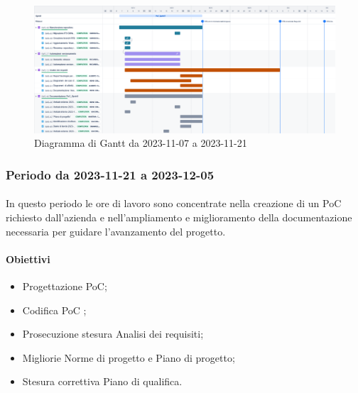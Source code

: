 \documentclass[10pt, a4paper]{article}
\begin{document}
{{{{{{{ \begin{figure}[H]
        \centering        
        \includegraphics[width=15.5cm]{periodo1.png}
        \caption{Diagramma di Gantt da 2023-11-07 a 2023-11-21 }
    \end{figure}


\subsubsection{Periodo da 2023-11-21 a 2023-12-05}
\paragraph{}In questo periodo le ore di lavoro sono concentrate nella creazione di un PoC richiesto dall'azienda e nell'ampliamento e miglioramento della documentazione necessaria per guidare l'avanzamento del progetto.
\paragraph{Obiettivi}
\begin{itemize}
    \item Progettazione PoC;
    \item Codifica PoC ;
    \item Prosecuzione stesura Analisi dei requisiti;
    \item Migliorie Norme di progetto e Piano di progetto;
    \item Stesura correttiva Piano di qualifica.
  
\end{itemize}

}}}}}}}
\end{document}
